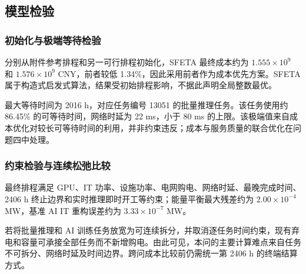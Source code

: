 \subsection{模型检验}

\subsubsection{初始化与极端等待检验}

分别从附件参考排程和另一可行排程初始化，SFETA 最终成本约为 $1.555\times10^9$ 和 $1.576\times10^9$ CNY，前者较低 1.34\%，因此采用前者作为成本优先方案。SFETA 属于构造式启发式算法，结果受初始排程影响，不据此声明全局整数最优。

最大等待时间为 2016 h，对应任务编号 13051 的批量推理任务。该任务使用约 86.45\% 的可等待时间，网络时延为 22 ms，小于 80 ms 的上限。该极端值来自成本优化对较长可等待时间的利用，并非约束违反；成本与服务质量的联合优化在问题四中处理。

\subsubsection{约束检验与连续松弛比较}

最终排程满足 GPU、IT 功率、设施功率、电网购电、网络时延、最晚完成时间、2406 h 终止边界和实时推理即时开工等约束；能量平衡最大残差约为 $2.00\times10^{-4}$ MW，基准 AI IT 重构误差约为 $3.33\times10^{-7}$ MW。

若将批量推理和 AI 训练任务放宽为可连续拆分，并取消逐任务时间约束，现有弃电和容量可承接全部任务而不新增购电。由此可见，本问的主要计算难点来自任务不可拆分、网络时延及时间边界。跨问成本比较前仍需统一第 2406 h 的终端结算方式。
